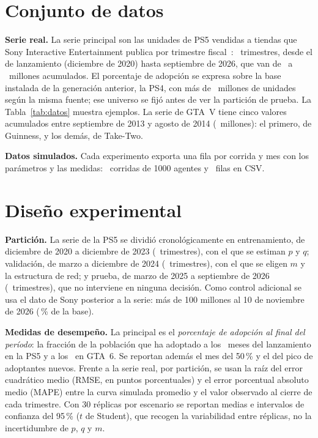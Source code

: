\documentclass[runningheads]{llncs}
\begin{document}
\section{Conjunto de datos}
\label{sec:datos}

\textbf{Serie real.} La serie principal son las unidades de PS5 vendidas a tiendas que Sony Interactive Entertainment publica por trimestre fiscal~\cite{sony2026}: \cifraTrimestres\ trimestres, desde el de lanzamiento (diciembre de 2020) hasta septiembre de 2026, que van de \cifraPsUnidadesIni\ a \cifraPsUnidadesFin\ millones acumulados. El porcentaje de adopción se expresa sobre la base instalada de la generación anterior, la PS4, con más de \cifraUniverso\ millones de unidades según la misma fuente; ese universo se fijó antes de ver la partición de prueba. La Tabla~\ref{tab:datos} muestra ejemplos. La serie de GTA~V tiene cinco valores acumulados entre septiembre de 2013 y agosto de 2014 (\cifraGtavSerie\ millones): el primero, de Guinness, y los demás, de Take-Two.



\textbf{Datos simulados.} Cada experimento exporta una fila por corrida y mes con los parámetros y las medidas: \cifraCorridas\ corridas de 1000 agentes y \cifraFilas\ filas en CSV.

\section{Diseño experimental}
\label{sec:diseno}

\textbf{Partición.} La serie de la PS5 se dividió cronológicamente en entrenamiento, de diciembre de 2020 a diciembre de 2023 (\cifraObsEnt\ trimestres), con el que se estiman $p$ y $q$; validación, de marzo a diciembre de 2024 (\cifraObsVal\ trimestres), con el que se eligen $m$ y la estructura de red; y prueba, de marzo de 2025 a septiembre de 2026 (\cifraObsPru\ trimestres), que no interviene en ninguna decisión. Como control adicional se usa el dato de Sony posterior a la serie: más de 100 millones al 10 de noviembre de 2026 (\cifraControlReal\,\% de la base).

\textbf{Medidas de desempeño.} La principal es el \emph{porcentaje de adopción al final del período}: la fracción de la población que ha adoptado a los \cifraHorizontePs\ meses del lanzamiento en la PS5 y a los \cifraHorizonteGta\ en GTA~6. Se reportan además el mes del 50\,\% y el del pico de adoptantes nuevos. Frente a la serie real, por partición, se usan la raíz del error cuadrático medio (RMSE, en puntos porcentuales) y el error porcentual absoluto medio (MAPE) entre la curva simulada promedio y el valor observado al cierre de cada trimestre. Con 30 réplicas por escenario se reportan medias e intervalos de confianza del 95\,\% ($t$ de Student), que recogen la variabilidad entre réplicas, no la incertidumbre de $p$, $q$ y $m$.
\end{document}
